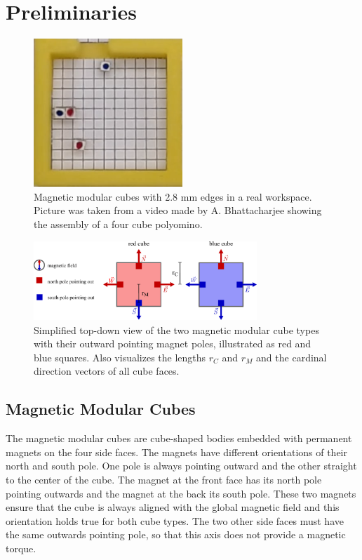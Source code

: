 \chapter{Preliminaries}
\label{chap:prelim}

\begin{figure}
	\centering
	\includegraphics[width=0.5\textwidth]{figures/real_mmcs.png}
	\caption[Picture of magnetic modular cubes in real workspace]{Magnetic modular cubes with 2.8 mm edges in a real workspace. Picture was taken from a video made by A. Bhattacharjee showing the assembly of a four cube polyomino.}
	\label{fig:real_mmcs}
\end{figure}

\begin{figure}
	\centering
	\includegraphics[width=0.75\textwidth]{figures/magnetic_cubes.pdf}
	\caption[Top-down view of the two magnetic modular cube types]{Simplified top-down view of the two magnetic modular cube types with their outward pointing magnet poles, illustrated as red and blue squares. Also visualizes the lengths $r_C$ and $r_M$ and the cardinal direction vectors of all cube faces.}
	\label{fig:magnetic_cubes}
\end{figure}

\section{Magnetic Modular Cubes}
The magnetic modular cubes are cube-shaped bodies embedded with permanent magnets on the four side faces.
The magnets have different orientations of their north and south pole. 
One pole is always pointing outward and the other straight to the center of the cube.
The magnet at the front face has its north pole pointing outwards and the magnet at the back its south pole.
These two magnets ensure that the cube is always aligned with the global magnetic field and this orientation holds true for both cube types.
The two other side faces must have the same outwards pointing pole, so that this axis does not provide a magnetic torque.


